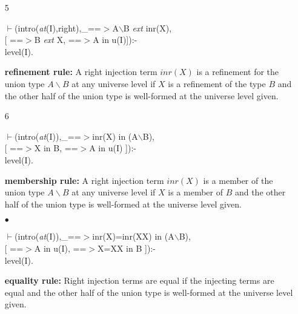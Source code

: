 \documentclass[11pt]{report}
\begin{document}
\begin{enumerate}
 {\bf equality rule:}
 Left injection terms are equal if the injecting terms are equal,
 and the other half of the union type is well-formed at the universe
 level given.
  
 \item[5]
\begin{sf}\begin{tabbing}
$\vdash$(intro(\mbox{\it at}(I),right),\_\hspace{0.1em}==$>$A$\backslash$B \mbox{\it ext} inr(X), \\[-0.15ex]
\hspace{2em}[ ==$>$B \mbox{\it ext} X, ==$>$A in u(I)]):-\\[-0.15ex]
\hspace{2em}level(I).
\end{tabbing}\end{sf}

 {\bf refinement rule:}
 A right injection term $inr(X)$ is a refinement for the union type
 $A\backslash B$ at any universe level
 if $X$ is a refinement of the type $B$ and the other half of the 
 union type is well-formed at the universe level given. 
  
 \item[6]
\begin{sf}\begin{tabbing}
$\vdash$(intro(\mbox{\it at}(I)),\_\hspace{0.1em}==$>$inr(X) in (A$\backslash$B), \\[-0.15ex]
\hspace{2em}[ ==$>$X in B, ==$>$A in u(I) ]):-\\[-0.15ex]
\hspace{2em}level(I).
\end{tabbing}\end{sf}

 {\bf membership rule:}
 A right injection term $inr(X)$ is a member of the union type
 $A\backslash B$ at any universe level
 if $X$ is a member of $B$ and the other half of the 
 union type is well-formed at the universe level given. 
  
 \item[$\bullet$]
\begin{sf}\begin{tabbing}
$\vdash$(intro(\mbox{\it at}(I)),\_\hspace{0.1em}==$>$inr(X)=inr(XX) in (A$\backslash$B),\\[-0.15ex]
\hspace{2em}[ ==$>$A in u(I), ==$>$X=XX in B ]):-\\[-0.15ex]
\hspace{2em}level(I).
\end{tabbing}\end{sf}

 {\bf equality rule:}
 Right injection terms are equal if the injecting terms are equal
 and the other half of the union type is well-formed at the universe
 level given.
 \end{enumerate}
  
\end{document}
